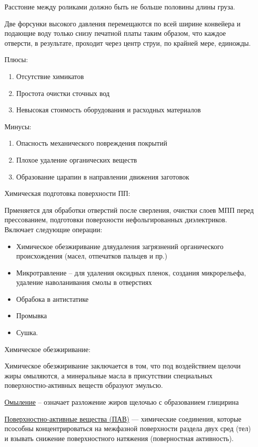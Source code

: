 \documentclass{article}
\begin{document}
Расстоние между роликами должно быть не больше половины длины груза.

Две форсунки высокого давления перемещаются по всей ширине конвейера и подающие воду только снизу печатной платы таким образом, что каждое отверсти, в результате, проходит через центр струи, по крайней мере, единожды.

Плюсы:
\begin{enumerate}
	\item Отсутствие химикатов
	\item Простота очистки сточных вод
	\item Невысокая стоимость оборудования и расходных материалов
\end{enumerate}
Минусы:
\begin{enumerate}
	\item Опасность механического повреждения покрытий
	\item Плохое удаление органических веществ
	\item Образование царапин в направлении движения заготовок
\end{enumerate}

Химическая подготовка поверхности ПП:

Прменяется для обработки отверстий после сверления, очистки слоев МПП перед прессованием, подготовки поверхности нефольгированных диэлектриков. Включает следующие операции:
\begin{itemize}
	\item Химическое обезжиривание дляудаления загрязнений органического происхождения (масел, отпечатков пальцев и пр.)
	\item Микротравление -- для удаления оксидных пленок, создания микрорельефа, удаление наволанивания смолы в отверстиях
	\item Обрабока в антистатике
	\item Промывка
	\item Сушка.
\end{itemize}

Химическое обезжиривание:

Химическое обезжиривание заключается в том, что под воздействием щелочи жиры омыляются, а минеральные масла в присутствии специальных поверхностно-активных веществ образуют эмульсю.

\underline{Омыление} -- означает разложение жиров щелочью с образованием глицирина

\underline{Поверхностно-активные вещества (ПАВ)} --- химические соединения, которые псособны концентрироваться на межфазной поверхности раздела двух сред (тел) и взывать снижение поверхностного натяжения (поверностная активность).
\end{document}
